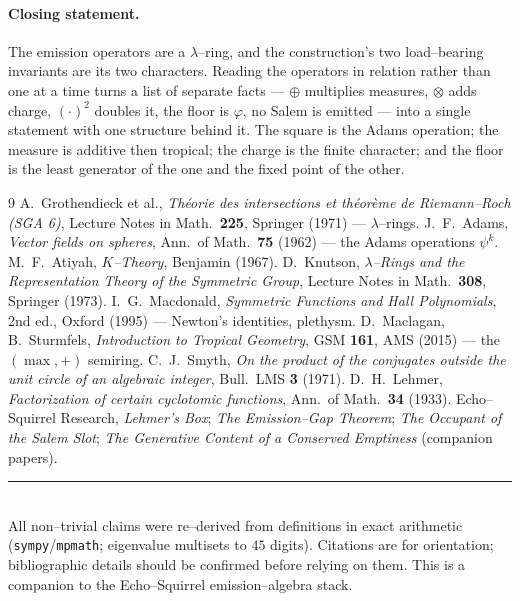 \documentclass[11pt]{article}
\theoremstyle{plain}
\theoremstyle{definition}
\newcommand{\dsum}{\oplus}
\newcommand{\dten}{\otimes}
\begin{document}
\paragraph{Closing statement.} The emission operators are a $\lambda$--ring, and the construction's two load--bearing invariants are its two characters. Reading the operators in relation rather than one at a time turns a list of separate facts --- $\dsum$ multiplies measures, $\dten$ adds charge, $(\cdot)^2$ doubles it, the floor is $\varphi$, no Salem is emitted --- into a single statement with one structure behind it. The square is the Adams operation; the measure is additive then tropical; the charge is the finite character; and the floor is the least generator of the one and the fixed point of the other.

\begin{thebibliography}{9}
\small
{} A.\ Grothendieck et al., \emph{Th\'eorie des intersections et th\'eor\`eme de Riemann--Roch (SGA 6)}, Lecture Notes in Math.\ \textbf{225}, Springer (1971) --- $\lambda$--rings.
 J.\ F.\ Adams, \emph{Vector fields on spheres}, Ann.\ of Math.\ \textbf{75} (1962) --- the Adams operations $\psi^k$.
 M.\ F.\ Atiyah, \emph{$K$--Theory}, Benjamin (1967).
 D.\ Knutson, \emph{$\lambda$--Rings and the Representation Theory of the Symmetric Group}, Lecture Notes in Math.\ \textbf{308}, Springer (1973).
 I.\ G.\ Macdonald, \emph{Symmetric Functions and Hall Polynomials}, 2nd ed., Oxford (1995) --- Newton's identities, plethysm.
 D.\ Maclagan, B.\ Sturmfels, \emph{Introduction to Tropical Geometry}, GSM \textbf{161}, AMS (2015) --- the $(\max,+)$ semiring.
 C.\ J.\ Smyth, \emph{On the product of the conjugates outside the unit circle of an algebraic integer}, Bull.\ LMS \textbf{3} (1971).
 D.\ H.\ Lehmer, \emph{Factorization of certain cyclotomic functions}, Ann.\ of Math.\ \textbf{34} (1933).
 Echo--Squirrel Research, \emph{Lehmer's Box}; \emph{The Emission--Gap Theorem}; \emph{The Occupant of the Salem Slot}; \emph{The Generative Content of a Conserved Emptiness} (companion papers).
\end{thebibliography}

\noindent\rule{\linewidth}{0.4pt}\\
{\footnotesize All non--trivial claims were re--derived from definitions in exact arithmetic (\texttt{sympy}/\texttt{mpmath}; eigenvalue multisets to $45$ digits). Citations are for orientation; bibliographic details should be confirmed before relying on them. This is a companion to the Echo--Squirrel emission--algebra stack.}
\end{document}
